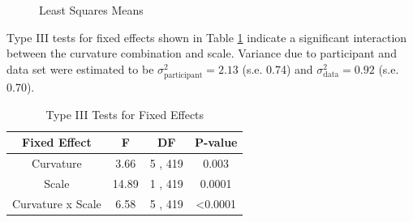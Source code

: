 \begin{appendix}
\begin{figure}
{}

\caption{Least Squares Means}\label{fig:lsmeans-plot}
\end{figure}

Type III tests for fixed effects shown in Table
\ref{tab:type3-fixed-effects} indicate a significant interaction between
the curvature combination and scale. Variance due to participant and
data set were estimated to be \(\sigma^2_{\text{participant}} = 2.13\)
(s.e. 0.74) and \(\sigma^2_{\text{data}} = 0.92\) (s.e. 0.70).

\begin{table}

\caption{\label{tab:type3-fixed-effects}Type III Tests for Fixed Effects}
\centering
\begin{tabular}[t]{cccc}
\toprule
Fixed Effect & F & DF & P-value\\
\midrule
Curvature & 3.66 & 5 , 419 & 0.003\\
Scale & 14.89 & 1 , 419 & 0.0001\\
Curvature x Scale & 6.58 & 5 , 419 & <0.0001\\
\bottomrule
\end{tabular}
\end{table}
\end{appendix}
